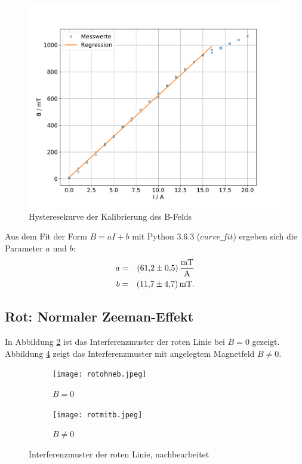 %
%
\begin{figure}[h!]
  \centering
  \includegraphics[width=\textwidth]{hysterese.pdf}
  \caption{Hysteresekurve der Kalibrierung des B-Felds}
  \label{fig:hysterese}
\end{figure}
Aus dem Fit der Form $B=aI+b$ mit Python 3.6.3 ($curve\_fit$) ergeben sich die Parameter $a$ und $b$:
\begin{align*}
   a &=& \SI{61.2 \pm 0.5}{\frac{mT}{A}} \\
   b &=& \SI{11.7 \pm 4.7}{mT}. \\
\end{align*}

\FloatBarrier
\subsection{Rot: Normaler Zeeman-Effekt}
In Abbildung \ref{fig:rotohneb} ist das Interferenzmuster der roten Linie bei $B=0$ gezeigt.
Abbildung \ref{fig:rotmitb} zeigt das Interferenzmuster mit angelegtem Magnetfeld $B≠0$.

\begin{figure}[h!]
   \begin{subfigure}{0.49\textwidth}
     \texttt{[image: rotohneb.jpeg]}
     \caption{$B=0$}
     \label{fig:rotohneb}
   \end{subfigure}
   \begin{subfigure}{0.49\textwidth}
     \texttt{[image: rotmitb.jpeg]}
     \caption{$B≠0$}
     \label{fig:rotmitb}
   \end{subfigure}
   \caption{Interferenzmuster der roten Linie, nachbearbeitet}
\end{figure}

